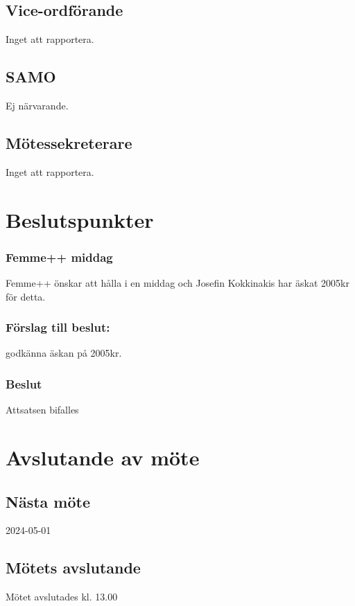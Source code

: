 \documentclass[protokoll]{dvd}
\begin{document}
\subsection{Vice-ordförande}
Inget att rapportera.

\subsection{SAMO}
Ej närvarande.

\subsection{Mötessekreterare}
Inget att rapportera.

\newpage
\section{Beslutspunkter}

\subsubsection*{Femme++ middag}
Femme++ önskar att hålla i en middag och Josefin Kokkinakis har
äskat 2005kr för detta.
\subsubsection*{Förslag till beslut:}
\begin{attsatser}
    \item godkänna äskan på 2005kr.
\end{attsatser}

\subsubsection*{Beslut}
\begin{attsatser}
    \item Attsatsen bifalles
\end{attsatser}

\newpage
\section{Avslutande av möte}

\subsection{Nästa möte}
2024-05-01

\subsection{Mötets avslutande}
Mötet avslutades kl. 13.00

\styrelsesignaturer
\end{document}
